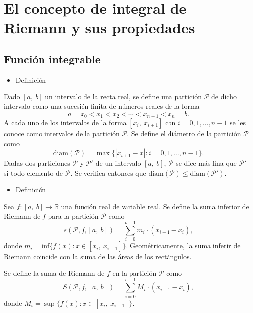 \section{El concepto de integral de Riemann y sus propiedades}
\subsection{Función integrable}
\begin{itemize}[label=\color{red}\textbullet, leftmargin=*]
	\item \color{lightblue}Definición
\end{itemize}
Dado $[a,~b]$ un intervalo de la recta real, se define una partición $\mathcal{P}$ de dicho intervalo como una sucesión finita de números reales de la forma \[ a=x_0<x_1<x_2<\cdots<x_{n-1}<x_n=b. \]A cada uno de los intervalos de la forma $[x_i,~x_{i+1}]$ con $i=0,1,\hdots,n-1$ se les conoce como intervalos de la partición $\mathcal{P}$. Se define el diámetro de la partición $\mathcal{P}$ como \[ \mathrm{diam}(\mathcal{P})=\max\{|x_{i+1}-x|:i=0,1,\hdots,n-1\}. \]Dadas dos particiones $\mathcal{P}$ y $\mathcal{P}'$ de un intervalo $[a,~b],~\mathcal{P}$ se dice más fina que $\mathcal{P}'$ si todo elemento de $\mathcal{P}$. Se verifica entonces que $\mathrm{diam}(\mathcal{P})\le\mathrm{diam}(\mathcal{P}')$.
\begin{itemize}[label=\color{red}\textbullet, leftmargin=*]
	\item \color{lightblue}Definición
\end{itemize}
Sea $f:[a,~b]\rightarrow\mathbb{R}$ una función real de variable real. Se define la suma inferior de Riemann de $f$ para la partición $\mathcal{P}$ como \[ s(\mathcal{P},f,[a,~b]) =\sum_{i=0}^{n-1}m_i\cdot(x_{i+1}-x_i),\] donde $m_i=\mathrm{inf}\{f(x):x\in[x_i,~x_{i+1}]\}$. Geométricamente, la suma inferir de Riemann coincide con la suma de las áreas de los rectángulos.

Se define la suma de Riemann de $f$ en la partición $\mathcal{P}$ como \[ S(\mathcal{P},f,[a,~b]) =\sum_{i=0}^{n-1}M_i\cdot(x_{i+1}-x_i),\] donde $M_i=\sup\{f(x):x\in[x_i,~x_{i+1}]\}$.

